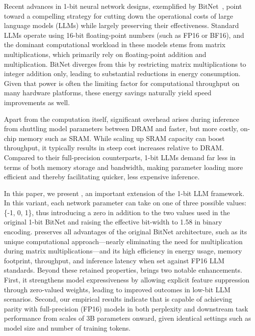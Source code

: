 Recent advances in 1-bit neural network designs, exemplified by BitNet~\cite{bitnet}, point toward a compelling strategy for cutting down the operational costs of large language models (LLMs) while largely preserving their effectiveness. Standard LLMs operate using 16-bit floating-point numbers (such as FP16 or BF16), and the dominant computational workload in these models stems from matrix multiplications, which primarily rely on floating-point addition and multiplication. BitNet diverges from this by restricting matrix multiplications to integer addition only, leading to substantial reductions in energy consumption. Given that power is often the limiting factor for computational throughput on many hardware platforms, these energy savings naturally yield speed improvements as well.

Apart from the computation itself, significant overhead arises during inference from shuttling model parameters between DRAM and faster, but more costly, on-chip memory such as SRAM. While scaling up SRAM capacity can boost throughput, it typically results in steep cost increases relative to DRAM. Compared to their full-precision counterparts, 1-bit LLMs demand far less in terms of both memory storage and bandwidth, making parameter loading more efficient and thereby facilitating quicker, less expensive inference.

In this paper, we present \textbf{}, an important extension of the 1-bit LLM framework. In this variant, each network parameter can take on one of three possible values: \{-1, 0, 1\}, thus introducing a zero in addition to the two values used in the original 1-bit BitNet and raising the effective bit-width to 1.58 in binary encoding.  preserves all advantages of the original BitNet architecture, such as its unique computational approach—nearly eliminating the need for multiplication during matrix multiplications—and its high efficiency in energy usage, memory footprint, throughput, and inference latency when set against FP16 LLM standards. Beyond these retained properties,  brings two notable enhancements. First, it strengthens model expressiveness by allowing explicit feature suppression through zero-valued weights, leading to improved outcomes in low-bit LLM scenarios. Second, our empirical results indicate that  is capable of achieving parity with full-precision (FP16) models in both perplexity and downstream task performance from scales of 3B parameters onward, given identical settings such as model size and number of training tokens.

